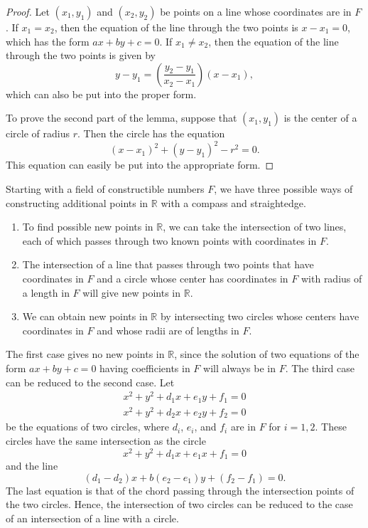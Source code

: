 \begin{proof}
Let $(x_1, y_1)$ and $(x_2, y_2)$ be points on a line whose
coordinates are in $F$.  If $x_1 = x_2$, then the equation of the line
through the two points is $x - x_1 = 0$, which has the form $a x + by +
c = 0$.  If $x_1 \neq x_2$, then the equation of the line through the
two points is given by  
\[
y - y_1 = \left( \frac{y_2 - y_1}{x_2 - x_1} \right) (x - x_1),
\]
which can also be put into the proper form.


To prove the second part of the lemma, suppose that $(x_1, y_1)$ is the
center of a circle of radius $r$.  Then the circle has the equation
\[
(x - x_1)^2 + (y - y_1)^2 - r^2 = 0.
\]
This equation can easily be put into the appropriate form.
\end{proof}


\medskip


Starting with a field of constructible numbers $F$, we have three 
possible ways of constructing additional points in ${\mathbb R}$ with a
compass and straightedge. 
\begin{enumerate}
 
\item 
To find possible new points in ${\mathbb R}$, we can take the
intersection of two lines, each of which passes through two known
points with coordinates in $F$. 
 
\item 
The intersection of a line that passes through two points that have 
coordinates in $F$ and a circle whose center has coordinates in $F$ 
with radius of a length in $F$ will give new points in ${\mathbb R}$.
 
\item 
We can obtain new points in ${\mathbb R}$ by intersecting two
circles whose centers have coordinates in $F$ and whose radii are of
lengths in $F$.
 
\end{enumerate}
The first case gives no new points in ${\mathbb R}$, since the solution 
of two equations of the form $a x + by + c = 0$ having coefficients in
$F$ will always be in $F$. The third case can be reduced to the second
case.  Let
\begin{align*}
x^2 + y^2 + d_1 x +e_1 y + f_1 = 0 \\
x^2 + y^2 + d_2 x +e_2 y + f_2 = 0
\end{align*} %
be the equations of two circles, where $d_i$, $e_i$, and $f_i$ are in
$F$ for $i = 1, 2$. These circles have the same intersection as the
circle  
\[
x^2 + y^2 + d_1 x +e_1 x + f_1 = 0 
\]
and the line
\[
(d_1 - d_2) x + b(e_2 - e_1)y + (f_2 - f_1) = 0.
\]
The last equation is that of the chord passing through the
intersection points of the two circles. Hence, the intersection of two
circles can be reduced to the case of an intersection of a line with a
circle. 
 

